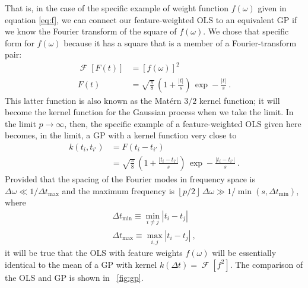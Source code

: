 \documentclass[12pt,letterpaper]{article}
\newcommand{\floor}[1]{\left\lfloor #1 \right\rfloor}
\DeclareMathOperator{\FT}{\mathscr{F}}
\begin{document}
That is, in the case of the specific example of weight function $f(\omega)$ given in equation \eqref{eq:f}, we can connect our feature-weighted OLS to an equivalent GP if we know the Fourier transform of the square of $f(\omega)$. We chose that specific form for $f(\omega)$ because it has a square that is a member of a Fourier-transform pair:
\begin{align}
    \FT[F(t)] &= [f(\omega)]^2
    \\ \label{eq:F}
    F(t) &= \sqrt{\frac{\pi}{8}}\,\left(1 + \frac{|t|}{s}\right)\,\exp -\frac{|t|}{s}
    ~.
\end{align}
This latter function is also known as the Mat\'ern $3/2$ kernel function; it will become the kernel function for the Gaussian process when we take the limit.
In the limit $p\rightarrow\infty$, then, the specific example of a feature-weighted OLS given here becomes, in the limit, a GP with a kernel function very close to
\begin{align}
    k(t_i,t_{i'}) &= F(t_i-t_{i'})
    \\ \label{eq:k}
    &= \sqrt{\frac{\pi}{8}}\,\left(1 + \frac{|t_i - t_{i'}|}{s}\right)\,\exp -\frac{|t_i - t_{i'}|}{s}
    ~.
\end{align}
Provided that the spacing of the Fourier modes in frequency space is $\Delta\omega\ll 1 / \Delta t_{\max}$ and the maximum frequency is $\floor{p / 2}\,\Delta\omega \gg 1 / \min(s, \Delta t_{\min})$, where
\begin{align}
    \Delta t_{\min} \equiv \min_{i\ne j}|t_i - t_j|
    \\
    \Delta t_{\max} \equiv \max_{i,j}|t_i - t_j|
    ~,
\end{align}
it will be true that the OLS with feature weights $f(\omega)$ will be essentially identical to the mean of a GP with kernel $k(\Delta t) = \FT[f^2]$.
The comparison of the OLS and GP is shown in \figurename~\ref{fig:gp}.
\end{document}
